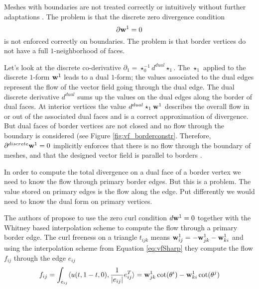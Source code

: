 Meshes with boundaries are not treated correctly or intuitively without further adaptations . The problem is that the discrete zero divergence condition
\[\partial \textbf{w}^1 = 0\]
is not enforced correctly on boundaries. The problem is that border vertices do not have a full $1$-neighborhood of faces. 

Let's look at the discrete co-derivative $\partial_1 = \star^{-1}_0 d^{dual} \star_1$. The $\star_1$ applied to the discrete $1$-form $\textbf{w}^1$ leads to a dual $1$-form; the values associated to the dual edges represent the flow of the vector field going through the dual edge. The dual discrete derivative $d^{dual}$ sums up the values on the dual edges along the border of dual faces. At interior vertices the value $d^{dual} \star_1 \textbf{w}^1$ describes the overall flow in or out of the associated dual faces and is a correct approximation of divergence. But dual faces of border vertices are not closed and no flow through the boundary is considered (see Figure \ref{fig:vf_borderconstr}. Therefore, $\partial^{discrete} \textbf{w}^1 = 0$ implicitly enforces that there is no flow through the boundary of meshes, and that the designed vector field is parallel to borders .

In order to compute the total divergence on a dual face of a border vertex we need to know the flow through primary border edges. But this is a problem. The value stored on primary edges is the flow along the edge. Put differently we would need to know the dual form on primary vertices. %

The authors of  propose to use the zero curl condition $d\textbf{w}^1 = 0$ together with the Whitney based interpolation scheme to compute the flow through a primary border edge. The curl freeness on a triangle $t_{ijk}$ means $\textbf{w}^1_{ij} = - \textbf{w}^1_{jk} - \textbf{w}^1_{ki}$ and using the interpolation scheme from Equation \ref{eq:vfSharp} they compute the flow $f_{ij}$ through the edge $e_{ij}$
\begin{equation}f_{ij} = \int_{e_{ij}}\langle u(t, 1-t, 0), \frac{1}{\left| e_{ij} \right|}e_{ij}^{T}\rangle = \textbf{w}^1_{jk} \cot(\theta^i) - \textbf{w}^1_{ki} \cot(\theta^j)\label{eq:vfFluxBorder}\end{equation}

